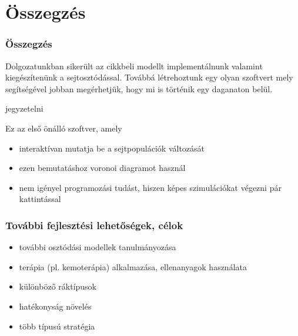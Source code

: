 \section{Összegzés}
\begin{frame}
\frametitle{Összegzés}

\begin{block}{}
Dolgozatunkban sikerült az \cite{archetti2016cooperation} cikkbeli modellt implementálnunk valamint kiegészítenünk a sejtosztódással. Továbbá létrehoztunk egy olyan szoftvert mely segítségével jobban megérhetjük, hogy mi is történik egy daganaton belül.

jegyzetelni
\end{block}

\pause
\begin{block}{Ez az első önálló szoftver, amely}
\begin{itemize}
	\item interaktívan mutatja be a sejtpopulációk változását
	\pause
	\item ezen bemutatáshoz voronoi diagramot használ
	\pause
	\item nem igényel programozási tudást, hiszen képes szimulációkat végezni pár kattintással
\end{itemize}
\end{block}
\end{frame}

\begin{frame}
\frametitle{További fejlesztési lehetőségek, célok}
\begin{itemize}
	\item további osztódási modellek tanulmányozása
	\item terápia (pl. kemoterápia) alkalmazása, ellenanyagok használata
	\item különböző ráktípusok
	\item hatékonyság növelés
	\item több típusú stratégia
\end{itemize}

\end{frame}